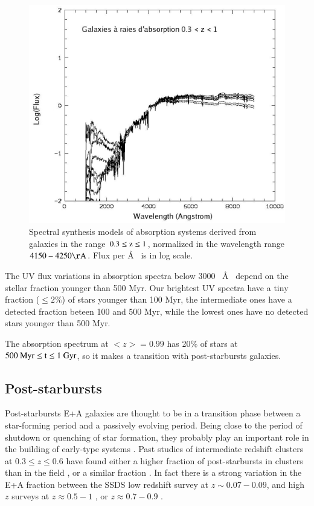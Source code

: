 \documentclass[referee]{aa}
\begin{document}
\begin{figure}
  \vspace{-0.0cm} 
 \centering
      \includegraphics[width=14cm]{figures/Abs.eps}
  \vspace{-0.0cm}
    \caption{Spectral synthesis models of absorption systems derived from galaxies in the range $\rm 0.3 \leq z \leq 1$, normalized in
the wavelength range $\rm 4150-4250\AA$. Flux per \AA~ is in log scale.  }
    \label{Abs-jpg} 
\end{figure}

The UV flux variations in absorption spectra below 3000~ \AA~ depend on the stellar fraction younger than 500 Myr. Our brightest
UV spectra have a tiny fraction ($\leq 2 \%$) of stars younger than 100 Myr, the intermediate ones have a detected
fraction beteen 100 and 500 Myr, while the lowest ones have no detected stars younger than 500 Myr.

The absorption spectrum at $<z> = 0.99$ has 20\% of stars at $\rm 500~ Myr \leq t \leq 1~ Gyr$, so it makes a transition
with post-starbursts galaxies.

\subsection{Post-starbursts}

Post-starbursts E+A galaxies are thought to be in a transition phase between a star-forming period and a 
passively evolving period. Being close to the period of shutdown or quenching of star formation, they probably  
play an important role in the building of early-type systems \citep[e.g.][]{Wild:2009, Yan:2009}.
Past studies of intermediate redshift clusters at $0.3 \leq z \leq 0.6$ have found either a higher fraction of 
post-starbursts in clusters than in the field \citep{Dressler:1999, Tran:2003, Tran:2004p5213}, or a similar fraction \citep{Balogh:1999p4259}.
In fact there is a strong variation in the E+A fraction between the SSDS low redshift survey at $z\sim0.07-0.09$,
and high $z$ surveys at $z \approx 0.5-1$ \citep[VVDS,][]{Wild:2009}, or $z \approx 0.7-0.9$ 
\citep[DEEP2,][]{Yan:2009}.
\end{document}

